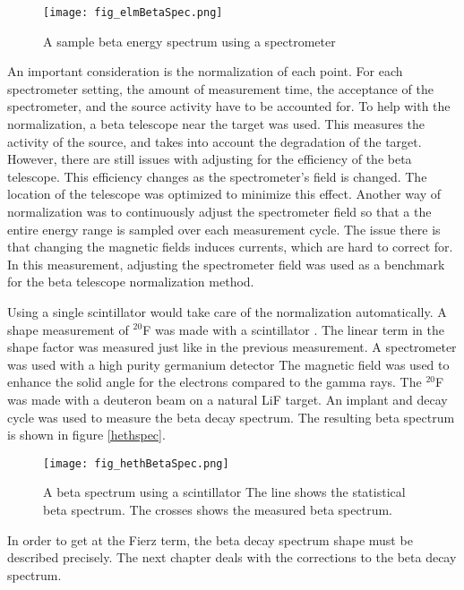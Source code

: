 \documentclass[main.tex]{subfiles}
\begin{document}
\begin{figure}[!htb]
	\centerline{\texttt{[image: fig\_elmBetaSpec.png]}}
	\caption{A sample beta energy spectrum using a spectrometer \cite{Elm87}}
	\label{fig:elmspec}
\end{figure}

An important consideration is the normalization of each point.
For each spectrometer setting, the amount of measurement time, the acceptance of the spectrometer, and the source activity have to be accounted for.
To help with the normalization, a beta telescope near the target was used.
This measures the activity of the source, and takes into account the degradation of the target.
However, there are still issues with adjusting for the efficiency of the beta telescope.
This efficiency changes as the spectrometer's field is changed.
The location of the telescope was optimized to minimize this effect.
Another way of normalization was to continuously adjust the spectrometer field so that a the entire energy range is sampled over each measurement cycle.
The issue there is that changing the magnetic fields induces currents, which are hard to correct for. 
In this measurement, adjusting the spectrometer field was used as a benchmark for the beta telescope normalization method.

Using a single scintillator would take care of the normalization automatically. 
A shape measurement of $^{20}$F was made with a scintillator \cite{Het89}.
The linear term in the shape factor was measured just like in the previous measurement.
A spectrometer was used with a high purity germanium detector
The magnetic field was used to enhance the solid angle for the electrons compared to the gamma rays.
The $^{20}$F was made with a deuteron beam on a natural LiF target. 
An implant and decay cycle was used to measure the beta decay spectrum. 
The resulting beta spectrum is shown in figure \ref{hethspec}.

\begin{figure}[!htb]
	\centerline{\texttt{[image: fig\_hethBetaSpec.png]}}
	\caption{A beta spectrum using a scintillator \cite{Het89}
		    The line shows the statistical beta spectrum.
		    The crosses shows the measured beta spectrum.}
	\label{fig:hethspec}
\end{figure}



In order to get at the Fierz term, the beta decay spectrum shape must be described precisely.
The next chapter deals with the corrections to the beta decay spectrum.  
\end{document}

